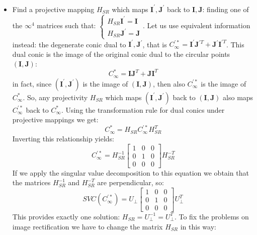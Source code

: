 \documentclass[12pt, a4paper]{report}
\newtheorem[style=M,bodystyle=\normalfont]{theorem}{Theorem}
\newtheorem[style=M,bodystyle=\normalfont]{corollary}{Corollary}
\newtheorem[style=M,bodystyle=\normalfont]{lemma}{Lemma}
\newtheorem[style=M,bodystyle=\normalfont]{definition}{Definition}
\begin{document}
    \begin{itemize}
        \item Find a projective mapping $H_{SR}$ which maps $\boldsymbol{I}^{'},\boldsymbol{J}^{'}$ back to 
            $\boldsymbol{I},\boldsymbol{J}$: finding one of the $\infty^{4}$ matrices such that: 
            $\begin{cases}
                H_{SR}\boldsymbol{I}^{'}=\boldsymbol{I} \\
                H_{SR}\boldsymbol{J}^{'}=\boldsymbol{J}
            \end{cases}$. Let us use equivalent information instead: the degenerate conic dual to $\boldsymbol{I}^{'},\boldsymbol{J}^{'}$, 
            that is $C_{\infty}^{'*}=\boldsymbol{I}^{'}\boldsymbol{J}^{'T}+\boldsymbol{J}^{'}\boldsymbol{I}^{'T}$. This dual conic is the 
            image of the original conic dual to the circular points $(\boldsymbol{I},\boldsymbol{J})$: 
            \[C_{\infty}^{*}=\boldsymbol{I}\boldsymbol{J}^{T}+\boldsymbol{J}\boldsymbol{I}^{T}\]
            in fact, since $(\boldsymbol{I}^{'},\boldsymbol{J}^{'})$ is the image of $(\boldsymbol{I},\boldsymbol{J})$, then also 
            $C_{\infty}^{'*}$ is the image of $C_{\infty}^{*}$. So, any projectivity $H_{SR}$ which maps $(\boldsymbol{I}^{'},\boldsymbol{J}^{'})$
            back to $(\boldsymbol{I},\boldsymbol{J})$ also maps $C_{\infty}^{'*}$ back to $C_{\infty}^{*}$. Using the transformation rule for dual 
            conics under projective mappings we get: 
            \[C^{*}_{\infty}=H_{SR}C^{'*}_{\infty}H_{SR}^T\]
            Inverting this relationship yields: 
            \[C_{\infty}^{'*}=H_{SR}^{-1} 
            \begin{bmatrix}
                1 & 0 & 0 \\
                0 & 1 & 0 \\
                0 & 0 & 0
            \end{bmatrix}
            H_{SR}^{-T}\]
            If we apply the singular value decomposition to this equation we obtain that the matrices $H_{SR}^{-1}$ and $H_{SR}^{-T}$ are
            perpendicular, so: 
            \[SVC(C_{\infty}^{'*})=U_\perp
            \begin{bmatrix}
                1 & 0 & 0 \\
                0 & 1 & 0 \\
                0 & 0 & 0
            \end{bmatrix}
            U_{\perp}^T\]
            This provides exactly one solution: $H_{SR}=U_{\perp}^{-1}=U_{\perp}^T$. To fix the problems on image rectification we have to change the matrix $H_{SR}$ in this way: 

\end{itemize}
\end{document}
